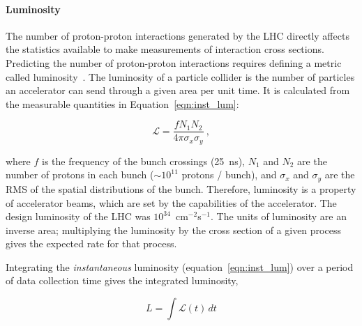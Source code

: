 \paragraph*{Luminosity} \hfill \break
The number of proton-proton interactions generated by the LHC directly affects the statistics available to make measurements of interaction cross sections.
Predicting the number of proton-proton interactions requires defining a metric called luminosity~\cite{zyla_review_2020}. The luminosity of a particle collider is the number of particles an accelerator can send through a given area per unit time. It is calculated from the measurable quantities in Equation~\ref{eqn:inst_lum}:

\begin{equation}
\mathcal{L} = \frac{f N_{1} N_{2} }{4 \pi \sigma_{x} \sigma_{y}}~,
\label{eqn:inst_lum}
\end{equation}

where $f$ is the frequency of the bunch crossings (\SI{25}{\nano\second}), $N_{1}$ and $N_{2}$ are the number of protons in each bunch ($\sim 10^{11}$ protons / bunch), and $\sigma_{x}$ and $\sigma_{y}$ are the RMS of the spatial distributions of the bunch. Therefore, luminosity is a property of accelerator beams, which are set by the capabilities of the accelerator. The design luminosity of the LHC was $10^{34}$~cm$^{-2}$s$^{-1}$. The units of luminosity are an inverse area; multiplying the luminosity by the cross section of a given process gives the expected rate for that process.

Integrating the \textit{instantaneous} luminosity (equation~\ref{eqn:inst_lum}) over a period of data collection time gives the integrated luminosity,

\begin{equation}
L = \int \mathcal{L} \left( t \right) \,dt
\label{eqn:int_lum}
\end{equation}

